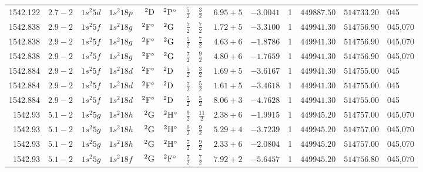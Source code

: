 \begin{table}
\begin{tabular}{rrr@{ -- }lr@{ -- }lr@{ -- }llrrr@{ -- }rl}
   1542.122\phantom{0000000} & $2.7-2$ &  $1s^{2}5d$ & $1s^{2}18p$ &       $^{2}{\rm D}$ & $^{2}{\rm P}^\circ$ &  $\frac{5}{2}$ & $\frac{3}{2}$  & $6.95+5$ & $ -3.0041$ &     1 & $449887.50$ & $514733.20$ & 045 \\
   1542.838\phantom{0000000} & $2.9-2$ &  $1s^{2}5f$ & $1s^{2}18g$ & $^{2}{\rm F}^\circ$ & $^{2}{\rm G}$       &  $\frac{7}{2}$ & $\frac{7}{2}$  & $1.72+5$ & $ -3.3100$ &     1 & $449941.30$ & $514756.90$ & 045,070 \\
   1542.838\phantom{0000000} & $2.9-2$ &  $1s^{2}5f$ & $1s^{2}18g$ & $^{2}{\rm F}^\circ$ & $^{2}{\rm G}$       &  $\frac{5}{2}$ & $\frac{7}{2}$  & $4.63+6$ & $ -1.8786$ &     1 & $449941.30$ & $514756.90$ & 045,070 \\
   1542.838\phantom{0000000} & $2.9-2$ &  $1s^{2}5f$ & $1s^{2}18g$ & $^{2}{\rm F}^\circ$ & $^{2}{\rm G}$       &  $\frac{7}{2}$ & $\frac{9}{2}$  & $4.80+6$ & $ -1.7659$ &     1 & $449941.30$ & $514756.90$ & 045,070 \\
   1542.884\phantom{0000000} & $2.9-2$ &  $1s^{2}5f$ & $1s^{2}18d$ & $^{2}{\rm F}^\circ$ & $^{2}{\rm D}$       &  $\frac{5}{2}$ & $\frac{3}{2}$  & $1.69+5$ & $ -3.6167$ &     1 & $449941.30$ & $514755.00$ & 045 \\
   1542.884\phantom{0000000} & $2.9-2$ &  $1s^{2}5f$ & $1s^{2}18d$ & $^{2}{\rm F}^\circ$ & $^{2}{\rm D}$       &  $\frac{7}{2}$ & $\frac{5}{2}$  & $1.61+5$ & $ -3.4618$ &     1 & $449941.30$ & $514755.00$ & 045 \\
   1542.884\phantom{0000000} & $2.9-2$ &  $1s^{2}5f$ & $1s^{2}18d$ & $^{2}{\rm F}^\circ$ & $^{2}{\rm D}$       &  $\frac{5}{2}$ & $\frac{5}{2}$  & $8.06+3$ & $ -4.7628$ &     1 & $449941.30$ & $514755.00$ & 045 \\
   1542.93\phantom{00000000} & $5.1-2$ &  $1s^{2}5g$ & $1s^{2}18h$ &       $^{2}{\rm G}$ & $^{2}{\rm H}^\circ$ &  $\frac{9}{2}$ & $\frac{11}{2}$ & $2.38+6$ & $ -1.9915$ &     1 & $449945.20$ & $514757.00$ & 045,070 \\
   1542.93\phantom{00000000} & $5.1-2$ &  $1s^{2}5g$ & $1s^{2}18h$ &       $^{2}{\rm G}$ & $^{2}{\rm H}^\circ$ &  $\frac{9}{2}$ & $\frac{9}{2}$  & $5.29+4$ & $ -3.7239$ &     1 & $449945.20$ & $514757.00$ & 045,070 \\
   1542.93\phantom{00000000} & $5.1-2$ &  $1s^{2}5g$ & $1s^{2}18h$ &       $^{2}{\rm G}$ & $^{2}{\rm H}^\circ$ &  $\frac{7}{2}$ & $\frac{9}{2}$  & $2.33+6$ & $ -2.0804$ &     1 & $449945.20$ & $514757.00$ & 045,070 \\
   1542.93\phantom{00000000} & $5.1-2$ &  $1s^{2}5g$ & $1s^{2}18f$ &       $^{2}{\rm G}$ & $^{2}{\rm F}^\circ$ &  $\frac{7}{2}$ & $\frac{7}{2}$  & $7.92+2$ & $ -5.6457$ &     1 & $449945.20$ & $514756.80$ & 045,070 \\

\end{tabular}
\end{table}
